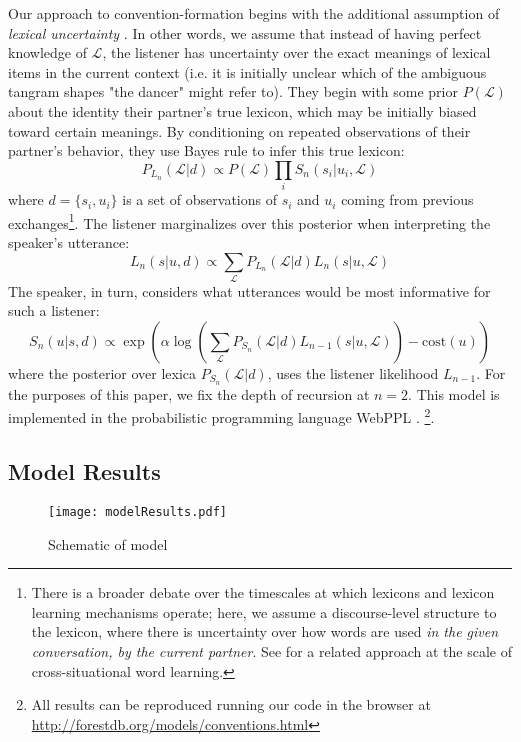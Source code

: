 Our approach to convention-formation begins with the additional assumption of \emph{lexical uncertainty} \cite{SmithGoodmanFrank13_RecursivePragmaticReasoningNIPS,BergenLevyGoodman16_LexicalUncertainty}. 
In other words, we assume that instead of having perfect knowledge of $\mathcal{L}$, the listener has uncertainty over the exact meanings of lexical items in the current context (i.e. it is initially unclear which of the ambiguous tangram shapes "the dancer" might refer to). They begin with some prior $P(\mathcal{L})$ about the identity their partner's true lexicon, which may be initially biased toward certain meanings. By conditioning on repeated observations of their partner's behavior, they use Bayes rule to infer this true lexicon:
$$P_{L_n}(\mathcal{L} | d) \propto P(\mathcal{L})\prod_i S_n(s_i|u_i, \mathcal{L})$$
where $d = \{s_i, u_i\}$ is a set of observations of $s_i$ and $u_i$ coming from previous exchanges\footnote{There is a broader debate over the timescales at which lexicons and lexicon learning mechanisms operate; here, we assume a discourse-level structure to the lexicon, where there is uncertainty over how words are used \emph{in the given conversation, by the current partner}. See \cite{FrankGoodmanTenenbaum09_Wurwur} for a related approach at the scale of cross-situational word learning.}. 
The listener marginalizes over this posterior when interpreting the speaker's utterance:
$$L_n(s | u, d) \propto \sum_\mathcal{L}P_{L_n}(\mathcal{L}|d)L_n(s|u,\mathcal{L})$$
The speaker, in turn, considers what utterances would be most informative for such a listener:
$$S_n(u | s, d) \propto \exp( \alpha\log\left(\sum_{\mathcal{L}} P_{S_n}(\mathcal{L} | d) L_{n-1}(s | u, \mathcal{L})\right) - \textrm{cost}(u) )$$
where the posterior over lexica $P_{S_n}(\mathcal{L} | d)$, uses the listener likelihood $L_{n-1}$. For the purposes of this paper, we fix the depth of recursion at $n = 2$.
This model is implemented in the probabilistic programming language WebPPL \cite{GoodmanStuhlmuller14_DIPPL}. \footnote{All results can be reproduced running our code in the browser at \url{http://forestdb.org/models/conventions.html}}. 

\subsection{Model Results}

\begin{figure}
\centering
    \texttt{[image: modelResults.pdf]}
  \caption{Schematic of model}
  \label{fig:task1model}
\end{figure}


